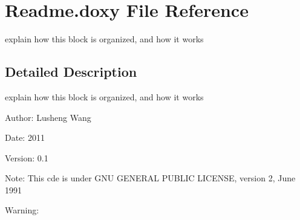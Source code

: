 \section{Readme.doxy File Reference}
\label{Readme_8doxy}
explain how this block is organized, and how it works  




\subsection{Detailed Description}
explain how this block is organized, and how it works 

\begin{Desc}
\item[Author:]Lusheng Wang \end{Desc}
\begin{Desc}
\item[Date:]2011 \end{Desc}
\begin{Desc}
\item[Version:]0.1 \end{Desc}
\begin{Desc}
\item[Note:]This cde is under GNU GENERAL PUBLIC LICENSE, version 2, June 1991 \end{Desc}
\begin{Desc}
\item[Warning:]\end{Desc}
